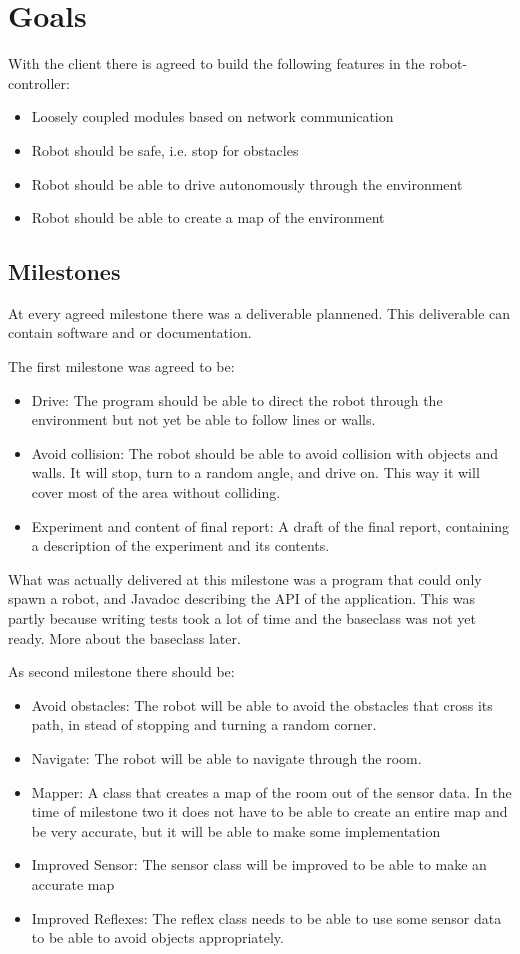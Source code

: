 \documentclass[titlepage, a4paper,10pt]{article}
\begin{document}
\newpage

\section{Goals}
With the client there is agreed to build the following features in the robot-controller:
\begin{itemize}
\item Loosely coupled modules based on network communication
\item Robot should be safe, i.e. stop for obstacles
\item Robot should be able to drive autonomously through the environment
\item Robot should be able to create a map of the environment
\end{itemize}

\subsection{Milestones}
At every agreed milestone there was a deliverable plannened. This deliverable can contain software and or documentation.

The first milestone was agreed to be:
\begin{itemize}
\item Drive: The program should be able to direct the robot through the environment but not yet be able to follow lines or walls.
\item Avoid collision: The robot should be able to avoid collision with objects and walls. It will stop, turn to a random angle, and drive on. This way it will cover most of the area without colliding.
\item Experiment and content of final report: A draft of the final report, containing a description of the experiment and its contents.
\end{itemize}

What was actually delivered at this milestone was a program that could only spawn a robot, and Javadoc describing the API of the application. This was partly because writing tests took a lot of time and the baseclass was not yet ready. More about the baseclass later.

As second milestone there should be:
\begin{itemize}
\item Avoid obstacles: The robot will be able to avoid the obstacles that cross its path, in stead of stopping and turning a random corner.
\item Navigate: The robot will be able to navigate through the room.
\item Mapper: A class that creates a map of the room out of the sensor data. In the time of milestone two it does not have to be able to create an entire map and be very accurate, but it will be able to make some implementation
\item Improved Sensor: The sensor class will be improved to be able to make an accurate map
\item Improved Reflexes: The reflex class needs to be able to use some sensor data to be able to avoid objects appropriately.
\end{itemize}
\end{document}
